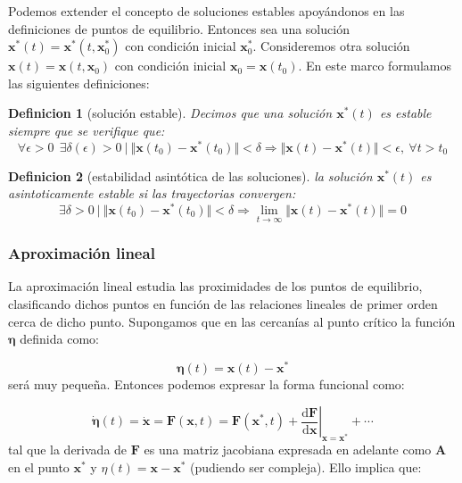 \documentclass[12pt,a4paper]{article}
\numberwithin{equation}{section}
\numberwithin{figure}{section}
\newcommand{\D}{\mathrm{d}}
\newcommand{\derivadas}[2]{\frac{\D #1}{\D #2}}
\newcommand{\xn}{\mathbf{x}}
\newcommand{\Fn}{\mathbf{F}}
\newcommand{\An}{\mathbf{A}}
\newcommand{\neta}{\boldsymbol{\eta}}
\newtheorem{definition}{Definicion}[section]
\begin{document}
Podemos extender el concepto de soluciones estables apoyándonos en las definiciones de puntos de equilibrio. Entonces sea una solución $\xn^* (t) = \xn^* (t,\xn_0^*)$ con condición inicial $\xn_0^*$. Consideremos otra solución $\xn (t) = \xn (t,\xn_0)$ con condición inicial $\xn_0 = \xn (t_0)$. En este marco formulamos las siguientes definiciones:

\begin{definition}[solución estable]
Decimos que una solución $\xn^*(t)$ es estable siempre que se verifique que:
\begin{equation}
\forall \epsilon > 0 \ \ \exists \delta(\epsilon)> 0 \ | \ \Vert \xn (t_0) - \xn^*(t_0) \Vert < \delta \Longrightarrow \Vert \xn (t) - \xn^* (t) \Vert < \epsilon, \ \forall t > t_0
\end{equation}
\end{definition}


\begin{definition}[estabilidad asintótica de las soluciones]
la solución $\xn^* (t)$ es asintoticamente estable si las trayectorias convergen:
\begin{equation}
\exists \delta > 0 \ | \ \Vert \xn(t_0) - \xn^* (t_0) \Vert < \delta \Longrightarrow \lim_{t \rightarrow \infty} \Vert \xn(t)  - \xn^* (t) \Vert = 0
\end{equation}
\end{definition}


\subsubsection{Aproximación lineal}

La aproximación lineal estudia las proximidades de los puntos de equilibrio, clasificando dichos puntos en función de las relaciones lineales de primer orden cerca de dicho punto. Supongamos que en las cercanías al punto crítico la función $\neta$ definida como:

\begin{equation}
\neta (t) = \xn (t) - \xn^*
\end{equation}
será muy pequeña. Entonces podemos expresar la forma funcional como:

\begin{equation}
\dot{\neta}(t) = \dot{\xn} = \Fn (\xn,t) = \Fn (\xn^*,t) + \left. \derivadas{\Fn}{\xn} \right|_{\xn = \xn ^*} + \cdots
\end{equation} 
tal que la derivada de $\Fn$ es una matriz jacobiana expresada en adelante como $\An$  en el punto $\xn^*$ y $\eta(t)=\xn-\xn^*$ (pudiendo ser compleja). Ello implica que:
\end{document}

